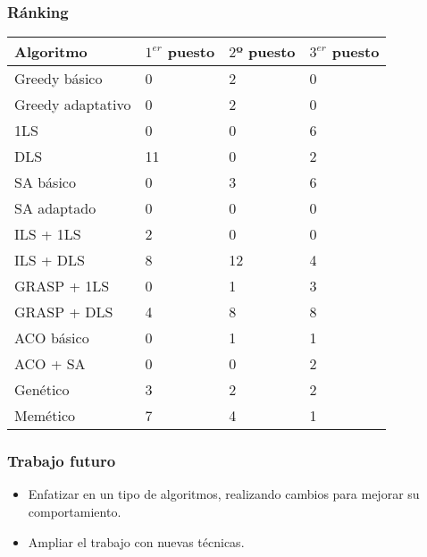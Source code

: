 \documentclass{beamer}
\theoremstyle{theorem}
\begin{document}
\begin{frame}
\frametitle{Ránking}

  \tiny
  \begin{table}
  \begin{tabular}{l l l l}
    \textbf{Algoritmo} & \textbf{$1^{er}$ puesto} & \textbf{$2$º puesto} & \textbf{$3^{er}$ puesto} \\ \hline
    Greedy básico          &  0  &  2  &  0  \\ \hline
    Greedy adaptativo      &  0  &  2  &  0  \\ \hline
    1LS                    &  0  &  0  &  6  \\ \hline
    DLS                    &  11  &  0  &  2  \\ \hline
    SA básico              &  0  &  3  &  6  \\ \hline
    SA adaptado            &  0  &  0  &  0  \\ \hline
    ILS + 1LS              &  2  &  0  &  0  \\ \hline
    ILS + DLS              &  8  &  12  &  4  \\ \hline
    GRASP + 1LS            &  0  &  1  &  3  \\ \hline
    GRASP + DLS            &  4  &  8  &  8  \\ \hline
    ACO básico             &  0  &  1  &  1  \\ \hline
    ACO + SA               &  0  &  0  &  2  \\ \hline
    Genético               &  3  &  2  &  2  \\ \hline
    Memético               &  7  &  4  &  1  \\ \hline
    \end{tabular}
  \end{table}
\end{frame}


\begin{frame}
  \frametitle{Trabajo futuro}

  \begin{itemize}
    \item Enfatizar en un tipo de algoritmos, realizando cambios para mejorar su comportamiento.
    \item Ampliar el trabajo con nuevas técnicas.
  \end{itemize}

\end{frame}
\end{document}
